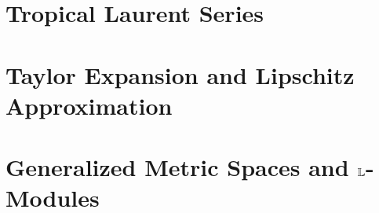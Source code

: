 \documentclass[a4paper,english, UKenglish,cleveref, autoref, thm-restate]{lipics-v2021}
\begin{document}
%
%
%


\section{Tropical Laurent Series}\label{sec:tls}



\section{Taylor Expansion and Lipschitz Approximation}


\section{Generalized Metric Spaces and $\mathbb{L}$-Modules}\label{sec:GMS}




\end{document}
